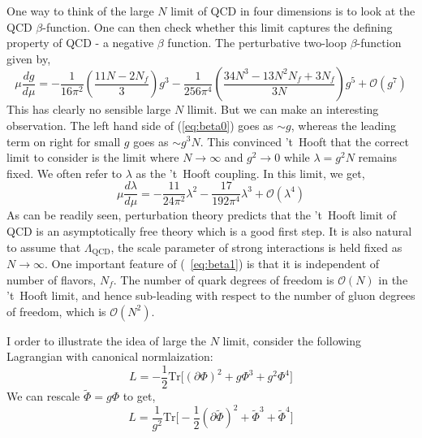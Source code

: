 \documentclass[11pt]{article}
\begin{document}
One way to think of the large $N$ limit of QCD in four dimensions is to 
look at the QCD $\beta$-function. One can then check 
whether this limit captures the defining property of QCD - a negative $\beta$ function. The perturbative 
two-loop $\beta$-function given by, 
\begin{equation} 
\label{eq:beta0}
\mu \frac{dg}{d\mu} = - \frac{1}{16\pi^2} \left (\frac{11N - 2N_{f}}{3} \right)g^3  - 
\frac{1}{256\pi^4} \left (\frac{34N^3 - 13 N^{2} N_{f} + 3N_{f}}{3N}\right)g^5 + \mathscr{O}(g^7)
\end{equation} 
This has clearly no sensible large $N$ llimit. But we can make an interesting observation. 
The left hand side of (\ref{eq:beta0}) goes as 
$ \sim g$, whereas the leading term on right for small $g$ 
goes as $ \sim g^3 N$. This convinced 't~Hooft that the 
correct limit to consider is the limit where $N \to 
\infty$ and $g^2 \to 0$ while $\lambda = g^2 N$ 
remains fixed. We often refer to $\lambda$ as the 't~Hooft coupling. 
In this limit, we get, 
\begin{equation} 
  \label{eq:beta1}
\mu \frac{d\lambda}{d\mu} = - \frac{11}{24 \pi^2} \lambda^2 -  \frac{17}{192 \pi^4} \lambda^3 + \mathscr{O}(\lambda^4) 
\end{equation} 
As can be readily seen, perturbation theory predicts that the 't~Hooft limit of QCD is an asymptotically free theory which is a good first step. It is also natural to assume that $\Lambda_{\text{QCD}}$, 
the scale parameter of strong interactions is held fixed as $N \to \infty$. One important feature of (~\ref{eq:beta1}) 
is that it is independent of number of flavors, $N_{f}$. The 
number of quark degrees of freedom is $\mathscr{O}(N)$ in the
't~Hooft limit, and hence sub-leading with respect to the number of gluon degrees of freedom, which is $\mathscr{O}(N^{2})$. 


I order to illustrate the idea of large the $N$ limit, consider the following Lagrangian with canonical normlaization:
\begin{equation}
L = -\frac{1}{2} \mathrm{Tr} \Bigg[ (\partial \Phi)^2 + g\Phi^3 + g^2\Phi^4  \Bigg] 
\end{equation} 
We can rescale $\tilde{\Phi} = g \Phi$  to get, 
\begin{equation}
L = \frac{1}{g^2} \mathrm{Tr} \Bigg[ -\frac{1}{2}(\partial \tilde{\Phi})^2 + \tilde{\Phi}^3 + \tilde{\Phi}^4  \Bigg]
\end{equation} 
\end{document}
